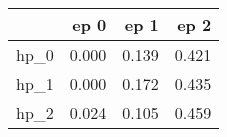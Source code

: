 \begin{tabular}{lrrr}
\toprule
{} &   ep 0 &   ep 1 &   ep 2 \\
\midrule
hp\_0 &  0.000 &  0.139 &  0.421 \\
hp\_1 &  0.000 &  0.172 &  0.435 \\
hp\_2 &  0.024 &  0.105 &  0.459 \\
\bottomrule
\end{tabular}

